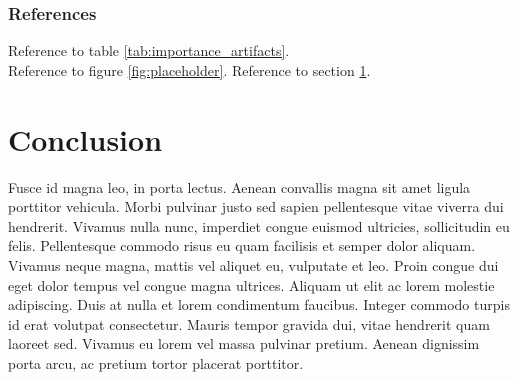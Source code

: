 \subsubsection{References}

Reference to table \ref{tab:importance_artifacts}.\\
Reference to figure \ref{fig:placeholder}.
Reference to section \ref{sec:conclusion}.


\newpage


\section{Conclusion}
\label{sec:conclusion}

Fusce id magna leo, in porta lectus. Aenean convallis magna sit amet ligula
porttitor vehicula. Morbi pulvinar justo sed sapien pellentesque vitae viverra
dui hendrerit. Vivamus nulla nunc, imperdiet congue euismod ultricies,
sollicitudin eu felis. Pellentesque commodo risus eu quam facilisis et semper
dolor aliquam. Vivamus neque magna, mattis vel aliquet eu, vulputate et leo.
Proin congue dui eget dolor tempus vel congue magna ultrices. Aliquam ut elit
ac lorem molestie adipiscing. Duis at nulla et lorem condimentum faucibus.
Integer commodo turpis id erat volutpat consectetur. Mauris tempor gravida
dui, vitae hendrerit quam laoreet sed. Vivamus eu lorem vel massa pulvinar
pretium. Aenean dignissim porta arcu, ac pretium tortor placerat porttitor. 







